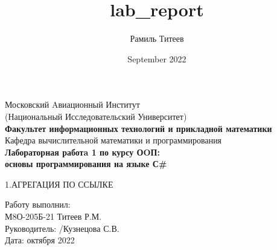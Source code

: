 \documentclass[12pt]{report}
\title{lab_report}
\author{Рамиль Титеев}
\date{September 2022}
\begin{document}
    \begin{titlepage}
        \begin{center}
            \large{Московский Aвиационный Институт}\\
            \large{(Национальный Исследовательский Университет)}\\
            \vspace{0.4in}
            \textbf{\LARGE{Факультет информационных технологий и прикладной математики}}\\
            \vspace{0.4in}
            \large{Кафедра вычислительной математики и программирования}\\
            \vspace{0.4in}
            \textbf{\LARGE{Лабораторная работa 1 по курсу ОOП:}}\\
            \textbf{\LARGE{основы программирования на языке С\#}}\\
        \end{center}
        \vspace{0.6in}
        \small{1.АГРЕГАЦИЯ ПО ССЫЛКЕ}\\
        \vfill
        \begin{flushleft}
                \large{ 
                    Работу выполнил:\\
                    М8О-205Б-21 \hspace{0.1in} 
                    Титеев Р.М. \hspace{0.3in}  
                    \hspace{0.3in} 
                    \\ 
                    Руководитель: /Кузнецова С.В. \\
                    Дата: \underline{\hspace{0.4in}} октября 2022\\
                }
        \end{flushleft}        
    \end{titlepage}
\end{document}
